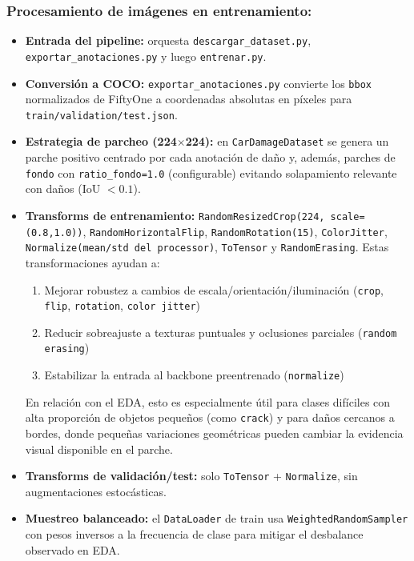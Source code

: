 \documentclass[12pt,a4paper]{article}
\begin{document}
\subsubsection{Procesamiento de imágenes en entrenamiento:}
\begin{itemize}
  \item \textbf{Entrada del pipeline:} orquesta \texttt{descargar\_dataset.py},
        \texttt{exportar\_anotaciones.py} y luego \texttt{entrenar.py}.
  \item \textbf{Conversión a COCO:} \texttt{exportar\_anotaciones.py} convierte los
        \texttt{bbox} normalizados de FiftyOne a coordenadas absolutas en píxeles
        para \texttt{train/validation/test.json}.
  \item \textbf{Estrategia de parcheo (224$\times$224):} en
        \texttt{CarDamageDataset} se genera un parche positivo centrado por cada
        anotación de daño y, además, parches de \texttt{fondo} con
        \texttt{ratio\_fondo=1.0} (configurable) evitando solapamiento relevante con
        daños (IoU $< 0.1$).
  \item \textbf{Transforms de entrenamiento:}
        \texttt{RandomResizedCrop(224, scale=(0.8,1.0))},
        \texttt{RandomHorizontalFlip}, \texttt{RandomRotation(15)},
        \texttt{ColorJitter}, \texttt{Normalize(mean/std del processor)}, \texttt{ToTensor}
        y \texttt{RandomErasing}. Estas transformaciones ayudan a:
        \begin{enumerate}
          \item Mejorar robustez a cambios de escala/orientación/iluminación (\texttt{crop}, \texttt{flip}, \texttt{rotation}, \texttt{color jitter})
          \item Reducir sobreajuste a texturas puntuales y oclusiones parciales (\texttt{random erasing})
          \item Estabilizar la entrada al backbone preentrenado (\texttt{normalize})
        \end{enumerate}
          En relación con el EDA, esto es especialmente útil para clases difíciles
          con alta proporción de objetos pequeños (como \texttt{crack}) y para daños
          cercanos a bordes, donde pequeñas variaciones geométricas pueden cambiar
          la evidencia visual disponible en el parche.
        
  \item \textbf{Transforms de validación/test:} solo \texttt{ToTensor} +
        \texttt{Normalize}, sin augmentaciones estocásticas.
  \item \textbf{Muestreo balanceado:} el \texttt{DataLoader} de train usa
        \texttt{WeightedRandomSampler} con pesos inversos a la frecuencia de clase para
        mitigar el desbalance observado en EDA.
\end{itemize}
\end{document}
